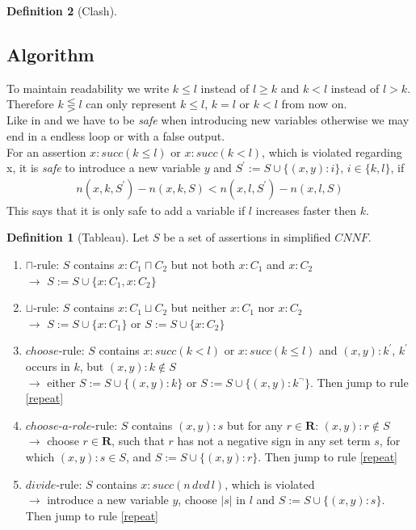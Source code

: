 \documentclass[a4paper,11pt]{scrartcl}
\theoremstyle{break}
\theoremstyle{definition}
\newtheorem{mydef}{Definition}
\begin{document}
\begin{mydef}[Clash]
\subsection{Algorithm}
To maintain readability we write $k\leq l$ instead of $l\geq k$ and $k<l$ instead of $l>k$. Therefore $k\lesseqgtr l$ can only represent $k\leq l$, $k=l$ or $k<l$ from now on.\\
Like in \cite{1} and \cite{6} we have to be \textit{safe} when introducing new variables otherwise we may end in a endless loop or with a false output.\\
For an assertion $x:succ(k\leq l)$ or $x:succ(k<l)$, which is violated regarding x, it is \textit{safe} to introduce a new variable $y$ and $S^\prime:=S\cup\{(x,y):i\}$, $i\in\{k,l\}$, if
\begin{align*}
n(x,k,S^\prime)-n(x,k,S)<n(x,l,S^\prime)-n(x,l,S)
\end{align*}
This says that it is only safe to add a variable if $l$ increases faster then $k$.
\begin{mydef}[Tableau]
Let $S$ be a set of assertions in simplified $CNNF$.
\begin{enumerate}
\item\label{cap} $\sqcap$-rule: $S$ contains $x:C_1\sqcap C_2$ but not both $x:C_1$ and $x:C_2$\\
$\rightarrow$ $S:=S\cup\{x:C_1, x:C_2\}$
\item\label{cup} $\sqcup$-rule: $S$ contains $x:C_1\sqcup C_2$ but neither $x:C_1$ nor $x:C_2$\\
$\rightarrow$ $S:=S\cup\{x:C_1\}$ or $S:=S\cup\{x:C_2\}$
\item\label{choose}$choose$-rule: $S$ contains $x:succ(k<l)$ or $x:succ(k\leq l)$ and $(x,y):k^\prime$, $k^\prime$ occurs in $k$, but $(x,y):k\notin S$\\
$\rightarrow$ either $S:=S\cup\{(x,y):k\}$ or $S:=S\cup\{(x,y):k^\neg\}$. Then jump to rule \ref{repeat}
\item\label{chooserole}$choose$-$a$-$role$-rule: $S$ contains $(x,y):s$ but for any $r\in\mathbf{R}$: $(x,y):r\notin S$\\
$\rightarrow$ choose $r\in\mathbf{R}$, such that $r$ has not a negative sign in any set term $s$, for which $(x,y):s\in S$, and $S:=S\cup\{(x,y):r\}$. Then jump to rule \ref{repeat}
\item\label{dvd}$divide$-rule: $S$ contains $x:succ(n\,dvd\,l)$, which is violated\\
$\rightarrow$ introduce a new variable $y$, choose $|s|$ in $l$ and $S:=S\cup\{(x,y):s\}$. Then jump to rule \ref{repeat}

\end{enumerate}
\end{mydef}
\end{mydef}
\end{document}

